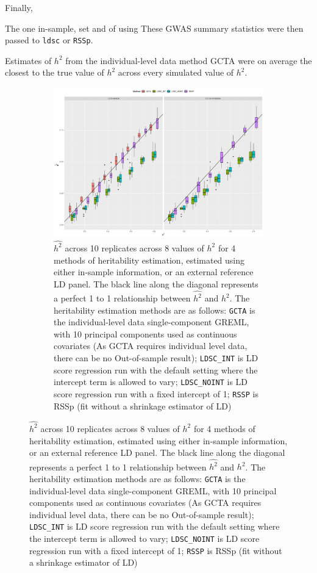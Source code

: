Finally, 



The  one in-sample, set and  of using These GWAS summary statistics were then passed to \texttt{ldsc} or \texttt{RSSp}.


Estimates of $h^2$ from the individual-level data method GCTA were on average the closest to the true value of $h^2$ across every simulated value of $h^2$. 



  \begin{figure}
      \centering
  \begin{subfigure}[t]{\textwidth}
    \centering
    \includegraphics[width=.9\linewidth]{img/rsspnld_v_ldsc_v_gcta.png}
    \caption{$\hat{h^2}$ across 10 replicates across 8 values of $h^2$ for 4 methods of heritability estimation, estimated using either in-sample information, or an external reference LD panel. The black line along the diagonal represents a perfect 1 to 1 relationship between $\hat{h^2}$ and $h^2$.    The heritability estimation methods are as follows: 
    \texttt{GCTA} is the individual-level data single-component GREML, with 10 principal components used as continuous covariates (As GCTA requires individual level data, there can be no Out-of-sample result);
    \texttt{LDSC\_INT} is LD score regression \cite{ldsc} run with the default setting where the intercept term is allowed to vary; 
    \texttt{LDSC\_NOINT} is LD score regression run with a fixed intercept of 1;
    \texttt{RSSP} is RSSp (fit without a shrinkage estimator of LD)}\label{fig:rssp_method_comparison}
  \end{subfigure}
\end{figure}


